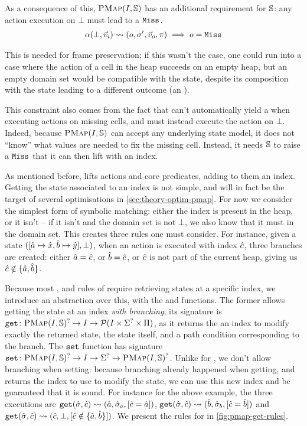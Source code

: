 As a consequence of this, $\textsc{PMap}(I,\mathbb S)$ has an additional requirement for $\mathbb S$: any action execution on $\bot$ must lead to a $\texttt{Miss}$. \begin{align*}
	\alpha(\bot,\vec{v}_i)\rightsquigarrow(o,\sigma',\vec{v}_o,\pi) \implies o=\texttt{Miss}
\end{align*}

This is needed for frame preservation; if this wasn't the case, one could run into a case where the action of a cell in the heap succeeds on an empty heap, but an empty domain set would be compatible with the state, despite its composition with the state leading to a different outcome (an \Err).

This constraint also comes from the fact that \PMap{} can't automatically yield a \Miss{} when executing actions on missing cells, and must instead execute the action on $\bot$. Indeed, because $\textsc{PMap}(I,\mathbb S)$ can accept any underlying state model, it does not ``know'' what values are needed to fix the missing cell. Instead, it needs $\mathbb S$ to raise a $\texttt{Miss}$ that it can then lift with an index.

As mentioned before, \PMap{} lifts actions and core predicates, adding to them an index. Getting the state associated to an index is not simple, and will in fact be the target of several optimisations in \cref{sec:theory-optim-pmap}. For now we consider the simplest form of symbolic matching: either the index is present in the heap, or it isn't -- if it isn't and the domain set is not $\bot$, we also know that it must in the domain set. This creates three rules one must consider. For instance, given a state $([\hat{a}\mapsto \hat{x}, \hat{b} \mapsto \hat{y}], \bot)$, when an action is executed with index $\hat{c}$, three branches are created: either $\hat{a} = \hat{c}$, or $\hat{b} = \hat{c}$, or $\hat{c}$ is not part of the current heap, giving us $\hat{c}\notin \{\hat{a},\hat{b}\}$.

Because most \execac, \consume{} and \produce{} rules of \PMap{} require retrieving states at a specific index, we introduce an abstraction over this, with the  and  functions. The former allows getting the state at an index \emph{with branching}; its signature is $\texttt{get}\colon \textsc{PMap}(I,\mathbb S)^? \rightarrow I \rightarrow {\cal P}(I \times \Sigma^? \times \Pi)$, as it returns the an index to modify exactly the returned state, the state itself, and a path condition corresponding to the branch. The $\texttt{set}$ function has signature $\texttt{set}\colon \textsc{PMap}(I,\mathbb S)^?\rightarrow I \rightarrow \Sigma^? \rightarrow \textsc{PMap}(I,\mathbb S)^?$. Unlike for , we don't allow branching when setting: because branching already happened when getting, and  returns the index to use to modify the state, we can use this new index and be guaranteed that it is sound. For instance for the above example, the three executions are ${\texttt{get}(\hat{\sigma},\hat{c})\rightsquigarrow(\hat{a}, \hat{\sigma}_a, [\hat{c} = \hat{a}])}$, ${\texttt{get}(\hat{\sigma}, \hat{c})\rightsquigarrow(\hat{b}, \hat{\sigma}_b, [\hat{c} = \hat{b}])}$ and ${\texttt{get}(\hat{\sigma},\hat{c})\rightsquigarrow(\hat{c}, \bot, [\hat{c}\notin \{\hat{a},\hat{b}\}])}$. We present the rules for  in \autoref{fig:pmap-get-rules}.


